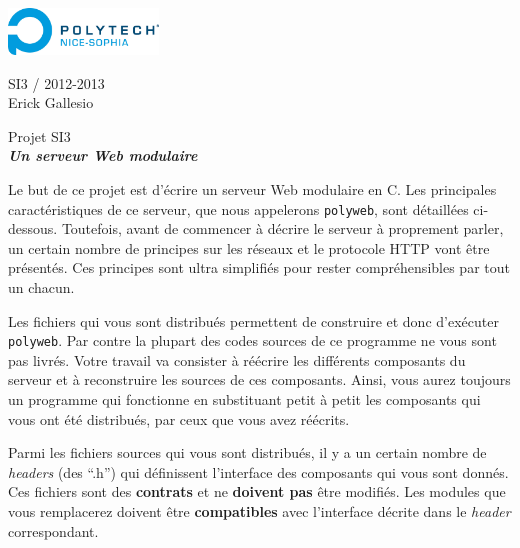 \documentclass[10pt,a4paper]{article}
\begin{document}
\newcommand{\promo}{2012-2013}

\thispagestyle{empty}
\lhead{}
\chead{}
\rhead{}
\renewcommand{\headrulewidth}{0pt}
\lfoot{\footnotesize\sc SI3 - \promo}
\cfoot{\thepage{}}
\renewcommand{\footrulewidth}{0.4pt}




\noindent
\includegraphics[width=4cm]{Ressources/pns.png}

\noindent
{\sc SI3 / \promo}\\
{\sc\small Erick Gallesio}
\vskip1cm

\parindent0pt

\begin{center}
{\huge  Projet SI3}\\[4mm]
{\bf \emph{Un serveur Web modulaire}}
\end{center}

Le but de ce projet est d'écrire un serveur Web modulaire en C. Les
principales caractéristiques de ce serveur, que nous appelerons
\texttt{polyweb}, sont détaillées ci-dessous. Toutefois, avant de
commencer à décrire le serveur à proprement parler, un certain nombre
de principes sur les réseaux et le protocole HTTP vont être
présentés. Ces principes sont ultra simplifiés pour rester
compréhensibles par tout un chacun.

Les fichiers qui vous sont distribués permettent de construire et donc
d'exécuter \texttt{polyweb}. Par contre la plupart des codes sources
de ce programme ne vous sont pas livrés. Votre travail va consister à
réécrire les différents composants du serveur et à reconstruire
les sources de ces  composants. Ainsi, vous aurez toujours un
programme qui fonctionne en substituant petit à petit les composants
qui vous ont été distribués, par ceux que vous avez réécrits.

Parmi les fichiers sources qui vous sont distribués, il y a un certain
nombre de \emph{headers} (des ``.h'') qui définissent l'interface des
composants qui vous sont donnés. Ces fichiers sont des
\textbf{contrats} et ne \textbf{doivent pas} être modifiés. Les
modules que vous remplacerez doivent être \textbf{compatibles} avec
l'interface décrite dans le \emph{header} correspondant.
\end{document}
